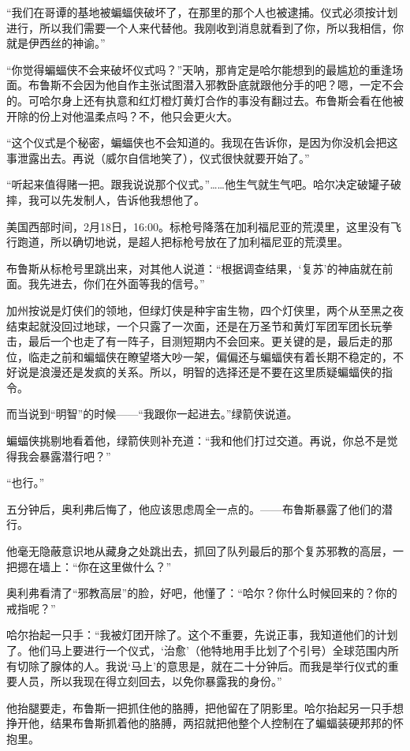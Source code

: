 \documentclass[../main]{subfiles}
\begin{document}
“我们在哥谭的基地被蝙蝠侠破坏了，在那里的那个人也被逮捕。仪式必须按计划进行，所以我们需要一个人来代替他。我刚收到消息就看到了你，所以我相信，你就是伊西丝的神谕。”

“你觉得蝙蝠侠不会来破坏仪式吗？”天呐，那肯定是哈尔能想到的最尴尬的重逢场面。布鲁斯不会因为他自作主张试图潜入邪教卧底就跟他分手的吧？嗯，一定不会的。可哈尔身上还有执意和红灯橙灯黄灯合作的事没有翻过去。布鲁斯会看在他被开除的份上对他温柔点吗？不，他只会更火大。

“这个仪式是个秘密，蝙蝠侠也不会知道的。我现在告诉你，是因为你没机会把这事泄露出去。再说（威尔自信地笑了），仪式很快就要开始了。”

“听起来值得赌一把。跟我说说那个仪式。”……他生气就生气吧。哈尔决定破罐子破摔，我可以先发制人，告诉他我想他了。

美国西部时间，2月18日，16:00。标枪号降落在加利福尼亚的荒漠里，这里没有飞行跑道，所以确切地说，是超人把标枪号放在了加利福尼亚的荒漠里。

布鲁斯从标枪号里跳出来，对其他人说道：“根据调查结果，`复苏'的神庙就在前面。我先进去，你们在外面等我的信号。”

加州按说是灯侠们的领地，但绿灯侠是种宇宙生物，四个灯侠里，两个从至黑之夜结束起就没回过地球，一个只露了一次面，还是在万圣节和黄灯军团军团长玩拳击，最后一个也走了有一阵子，目测短期内不会回来。更关键的是，最后走的那位，临走之前和蝙蝠侠在瞭望塔大吵一架，偏偏还与蝙蝠侠有着长期不稳定的，不好说是浪漫还是发疯的关系。所以，明智的选择还是不要在这里质疑蝙蝠侠的指令。

而当说到“明智”的时候——“我跟你一起进去。”绿箭侠说道。

蝙蝠侠挑剔地看着他，绿箭侠则补充道：“我和他们打过交道。再说，你总不是觉得我会暴露潜行吧？”

“也行。”

五分钟后，奥利弗后悔了，他应该思虑周全一点的。——布鲁斯暴露了他们的潜行。

他毫无隐蔽意识地从藏身之处跳出去，抓回了队列最后的那个复苏邪教的高层，一把摁在墙上：“你在这里做什么？”

奥利弗看清了“邪教高层”的脸，好吧，他懂了：“哈尔？你什么时候回来的？你的戒指呢？”

哈尔抬起一只手：“我被灯团开除了。这个不重要，先说正事，我知道他们的计划了。他们马上要进行一个仪式，`治愈'（他特地用手比划了个引号）全球范围内所有切除了腺体的人。我说`马上'的意思是，就在二十分钟后。而我是举行仪式的重要人员，所以我现在得立刻回去，以免你暴露我的身份。”

他抬腿要走，布鲁斯一把抓住他的胳膊，把他留在了阴影里。哈尔抬起另一只手想挣开他，结果布鲁斯抓着他的胳膊，两招就把他整个人控制在了蝙蝠装硬邦邦的怀抱里。
\end{document}
